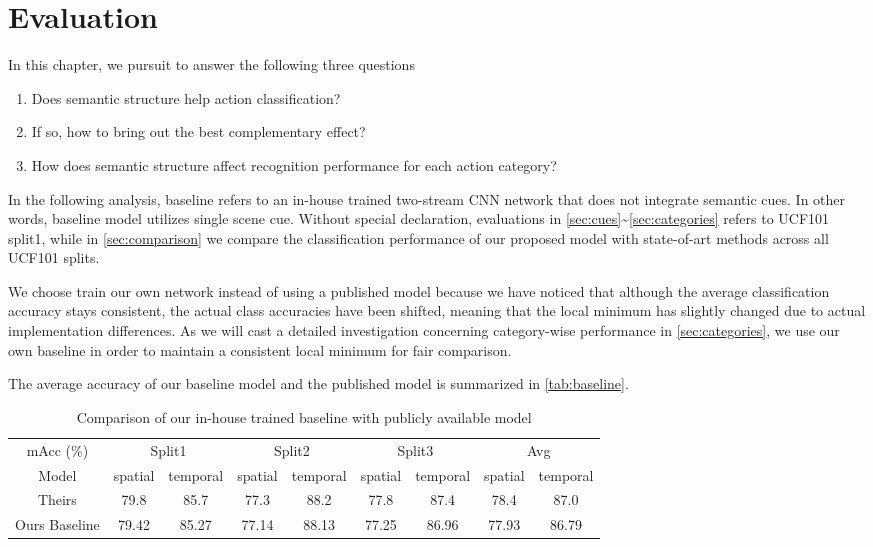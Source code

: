 \chapter{Evaluation}\label{chap:result}
In this chapter, we pursuit to answer the following three questions
\begin{enumerate}
	\item Does semantic structure help action classification?
	\item If so, how to bring out the best complementary effect?
	\item How does semantic structure affect recognition performance for each action category?
\end{enumerate}
In the following analysis, baseline refers to an in-house trained two-stream CNN network that does not integrate semantic cues. 
In other words, baseline model utilizes single scene cue.
Without special declaration, evaluations in  \autoref{sec:cues}\textasciitilde\autoref{sec:categories} refers to UCF101 split1, while in \autoref{sec:comparison} we compare the classification performance of our proposed model with state-of-art methods across all UCF101 splits.

We choose train our own network instead of using a published model \cite{wang2015towards} because we have noticed that although the average classification accuracy stays consistent, the actual class accuracies have been shifted, meaning that the local minimum has slightly changed due to actual implementation differences. 
As we will cast a detailed investigation concerning category-wise performance in \autoref{sec:categories}, we use our own baseline in order to maintain a consistent local minimum for fair comparison.

The average accuracy of our baseline model and the published model is summarized in \autoref{tab:baseline}.

\begin{table}[h]
\small
\begin{tabular}{|c|*{8}{c}|}
\hline
mAcc (\%) &\multicolumn{2}{c}{Split1} &\multicolumn{2}{c}{Split2} &\multicolumn{2}{c}{Split3} &\multicolumn{2}{c|}{Avg} \\
Model & spatial & temporal & spatial & temporal & spatial & temporal & spatial & temporal \\\hline
Theirs & 79.8 & 85.7& 77.3 & 88.2&77.8&87.4 &78.4 &87.0\\
Ours Baseline & 79.42 & 85.27&77.14 & 88.13& 77.25 & 86.96 &77.93& 86.79\\\hline
\end{tabular}\caption[Baseline Results]{Comparison of our in-house trained baseline with publicly available model \cite{wang2015towards}}\label{tab:baseline}
\end{table}

